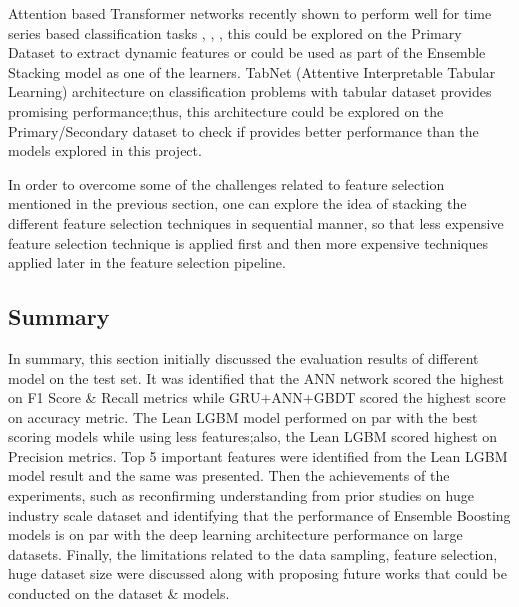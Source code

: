 \documentclass[twoside,11pt,a4paper]{article}
\begin{document}
Attention based Transformer networks recently shown to perform well for time series based classification tasks \citep{wen2022transformers}, \citep{lim2021temporal}, \citep{cholakov2021transformers}, this could be explored on the Primary Dataset to extract dynamic features or could be used as part of the Ensemble Stacking model as one of the learners. TabNet (Attentive Interpretable Tabular Learning)\citep{arik2021tabnet} architecture on classification problems with tabular dataset provides promising performance;thus, this architecture could be explored on the Primary/Secondary dataset to check if provides better performance than the models explored in this project.

In order to overcome some of the challenges related to feature selection mentioned in the previous section, one can explore the idea of stacking the different feature selection techniques in sequential manner, so that less expensive feature selection technique is applied first and then more expensive techniques applied later in the feature selection pipeline.
\subsection{Summary}
In summary, this section initially discussed the evaluation results of different model on the test set. It was identified that the \acs{ANN} network scored the highest on F1 Score \& Recall metrics while \acs{GRU}+\acs{ANN}+\acs{GBDT} scored the highest score on accuracy metric. The Lean \acs{LGBM} model performed on par with the best scoring models while using less features;also, the Lean \acs{LGBM} scored highest on Precision metrics. Top 5 important features were identified from the Lean \acs{LGBM} model result and the same was presented.
Then the achievements of the experiments, such as reconfirming understanding from prior studies on huge industry scale dataset and identifying that the performance of Ensemble Boosting models is on par with the deep learning architecture performance on large datasets.
Finally, the limitations related to the data sampling, feature selection, huge dataset size were discussed along with proposing future works that could be conducted on the dataset \& models.
\vfill
\clearpage
\end{document}
